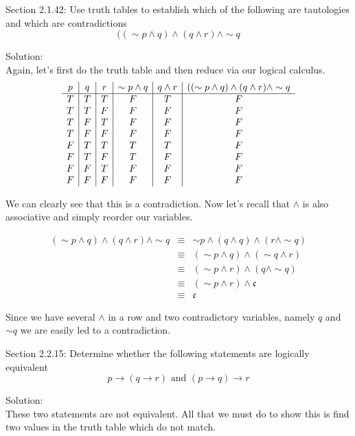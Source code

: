 \documentclass[10 pt]{amsart}
\theoremstyle{definition}
\theoremstyle{remark}
\numberwithin{equation}{subsection}
\begin{document}
\newpage

Section 2.1.42: Use truth tables to establish which of the following are tautologies and which are contradictions
\[
((\sim p \wedge q)\wedge (q\wedge r) \wedge \sim q
\]

Solution:\\
Again, let's first do the truth table and then reduce via our logical calculus.
\[
\begin{array}{c | c | c | c | c | c }
p & q & r & \sim p \wedge q & q\wedge r & ((\sim p \wedge q)\wedge (q\wedge r) \wedge \sim q\\
\hline
T & T & T & F & T & F\\
T & T & F & F & F & F\\
T & F & T & F & F & F\\
T & F & F & F & F & F\\
F & T & T & T & T & F\\
F & T & F & T & F & F\\
F & F & T & F & F & F\\
F & F & F & F & F & F
\end{array}
\]

We can clearly see that this is a contradiction. Now let's recall that $\wedge$ is also associative and simply reorder our variables.

\begin{eqnarray*}
(\sim p \wedge q)\wedge (q\wedge r) \wedge \sim q & \equiv & \sim p \wedge (q\wedge q) \wedge (r\wedge \sim q)\\
& \equiv & (\sim p \wedge q)\wedge (\sim q \wedge r)\\
& \equiv & (\sim p \wedge r) \wedge (q\wedge\sim q)\\
& \equiv & (\sim p \wedge r) \wedge \mathfrak{c}\\
& \equiv & \mathfrak{c}
\end{eqnarray*}

Since we have several $\wedge$ in a row and two contradictory variables, namely $q$ and $\sim q$ we are easily led to a contradiction.

\newpage

Section 2.2.15: Determine whether the following statements are logically equivalent
\[
p \rightarrow (q\rightarrow r) \text{ and } (p\rightarrow q)\rightarrow r
\]

Solution:\\
These two statements are not equivalent.  All that we must do to show this is find two values in the truth table which do not match.
\end{document}
